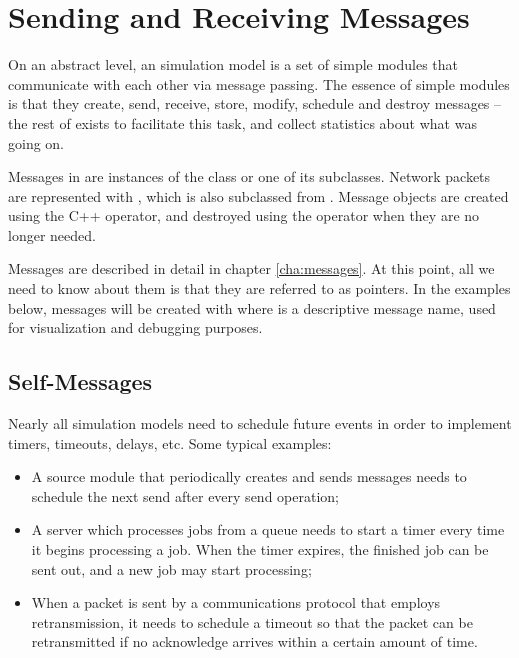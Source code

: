 \section{Sending and Receiving Messages}
\label{sec:simple-modules:sending-and-receiving}

On an abstract level, an {\opp} simulation model is a set of
simple modules that communicate with each other via message passing.
The essence of simple modules is that they create, send, receive,
store, modify, schedule and destroy messages -- the rest of {\opp} exists
to facilitate this task, and collect statistics
about what was going on.

Messages in {\opp} are instances of the  class or one of
its subclasses. Network packets are represented with ,
which is also subclassed from . Message objects are
created using the C++  operator, and destroyed using the
 operator when they are no longer needed.

Messages are described in detail in chapter \ref{cha:messages}.
At this point, all we need to know about them is that they are
referred to as  pointers. In the examples below,
messages will be created with  where
 is a descriptive message name, used for visualization
and debugging purposes.


\subsection{Self-Messages}
\label{sec:ch-simple-modules:self-messages}

Nearly all simulation models need to schedule future events in order
to implement timers, timeouts, delays, etc. Some typical examples:

\begin{itemize}
  \item A source module that periodically creates and sends messages
    needs to schedule the next send after every send operation;
  \item A server which processes jobs from a queue needs to start
    a timer every time it begins processing a job. When the timer
    expires, the finished job can be sent out, and a new job may
    start processing;
  \item When a packet is sent by a communications protocol that employs
    retransmission, it needs to schedule a timeout so that the packet
    can be retransmitted if no acknowledge arrives within a certain
    amount of time.
\end{itemize}

